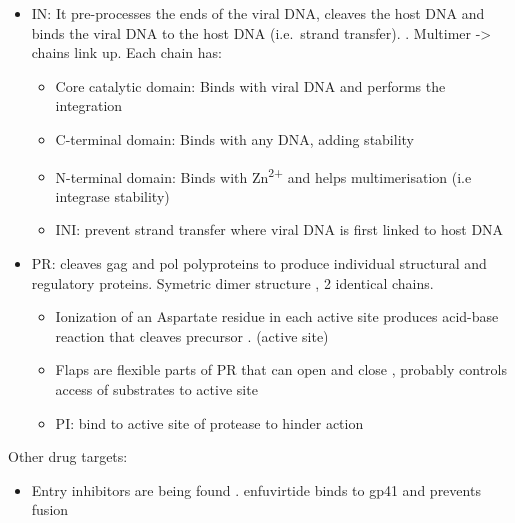 \documentclass[
  11pt,
  twoside]{scrbook}
\providecommand{\tightlist}{%
  \setlength{\itemsep}{0pt}\setlength{\parskip}{0pt}}
\begin{document}
\begin{itemize}
\item
  IN: It pre-processes the ends of the viral DNA, cleaves the host DNA and binds the viral DNA to the host DNA (i.e.~strand transfer). \autocite{chiuStructureFunctionHIV12004,espositoHIVIntegraseStructure1999,delelisIntegraseIntegrationBiochemical2008}. Multimer -\textgreater{} chains link up. Each chain has:

  \begin{itemize}
  \item
    Core catalytic domain: Binds with viral DNA and performs the integration
  \item
    C-terminal domain: Binds with any DNA, adding stability
  \item
    N-terminal domain: Binds with Zn\textsuperscript{2+} and helps multimerisation (i.e integrase stability)
  \item
    INI: prevent strand transfer where viral DNA is first linked to host DNA \autocite{pommierIntegraseInhibitorsTreat2005}
  \end{itemize}
\item
  PR: cleaves gag and pol polyproteins to produce individual structural and regulatory proteins. Symetric dimer structure \autocite{pearlStructuralModelRetroviral1987,gulnikHIVProteaseEnzyme2000}, 2 identical chains.

  \begin{itemize}
  \item
    Ionization of an Aspartate residue in each active site produces acid-base reaction that cleaves precursor \autocite{silvaInhibitionCatalyticMechanism1996}. (active site)
  \item
    Flaps are flexible parts of PR that can open and close \autocite{hornakHIV1ProteaseFlaps2006}, probably controls access of substrates to active site \autocite{yuStructuralInsightsHIV12017}
  \item
    PI: bind to active site of protease to hinder action \autocite{robertsRationalDesignPeptideBased1990}
  \end{itemize}
\end{itemize}

Other drug targets:

\begin{itemize}
\tightlist
\item
  Entry inhibitors are being found \autocite{esteHIVEntryInhibitors2007,kilbyNovelTherapiesBased2003}. enfuvirtide binds to gp41 and prevents fusion \autocite{fletcherEnfuvirtideNewDrug2003}
\end{itemize}
\end{document}
